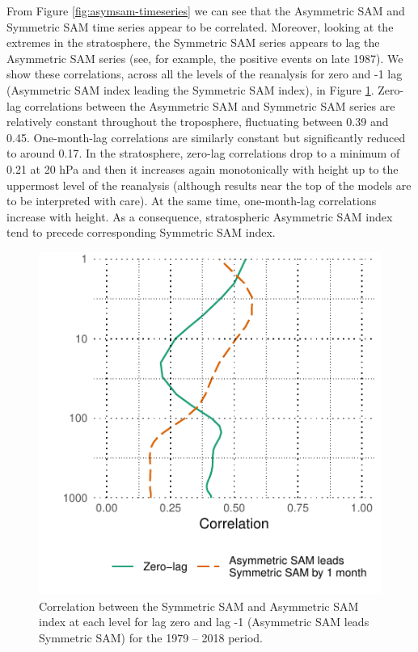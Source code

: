 \documentclass[smallextended]{svjour3}       %
\begin{document}
From Figure \ref{fig:asymsam-timeseries} we can see that the Asymmetric SAM and Symmetric SAM time series appear to be correlated. Moreover, looking at the extremes in the stratosphere, the Symmetric SAM series appears to lag the Asymmetric SAM series (see, for example, the positive events on late 1987). We show these correlations, across all the levels of the reanalysis for zero and -1 lag (Asymmetric SAM index leading the Symmetric SAM index), in Figure \ref{fig:cor-lev}. Zero-lag correlations between the Asymmetric SAM and Symmetric SAM series are relatively constant throughout the troposphere, fluctuating between 0.39 and 0.45. One-month-lag correlations are similarly constant but significantly reduced to around 0.17. In the stratosphere, zero-lag correlations drop to a minimum of 0.21 at 20 hPa and then it increases again monotonically with height up to the uppermost level of the reanalysis (although results near the top of the models are to be interpreted with care). At the same time, one-month-lag correlations increase with height. As a consequence, stratospheric Asymmetric SAM index tend to precede corresponding Symmetric SAM index.

\begin{figure}
\includegraphics{cor-lev-1} \caption{Correlation between the Symmetric SAM and Asymmetric SAM index at each level for lag zero and lag -1 (Asymmetric SAM leads Symmetric SAM) for the 1979 -- 2018 period.}\label{fig:cor-lev}
\end{figure}
\end{document}
